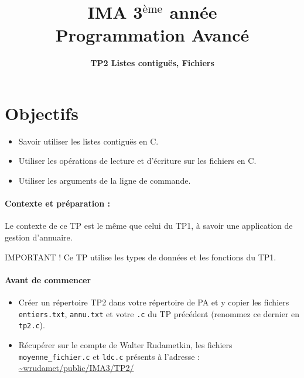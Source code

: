 \documentclass[final, pdftex, a4paper, openbib, ]{article}
\title{IMA 3$^{\mbox{\`eme}}$ année\\ Programmation Avancé
}
\author{\huge \textbf{TP2 Listes contiguës, Fichiers}}
\date{}
\begin{document}
\posttitle{\par\end{center}}
\setlength{\droptitle}{-45pt}
\maketitle

\vspace{-1.7cm}
\section{Objectifs}

\begin{itemize}
	\item Savoir utiliser les listes contiguës en C.
	\item Utiliser les opérations de lecture et d'écriture sur les fichiers en C.
	\item Utiliser les arguments de la ligne de commande.
\end{itemize}


\paragraph{Contexte et préparation : } Le contexte de ce TP est le même que celui du TP1, à savoir une application de gestion d'annuaire.

\begin{alertinfo}{IMPORTANT !}
	Ce TP utilise les types de données et les fonctions du TP1.
\end{alertinfo}


\paragraph{Avant de commencer}
\begin{itemize}
\item Créer un répertoire TP2 dans votre répertoire de PA et y copier les fichiers \texttt{entiers.txt}, \texttt{annu.txt} et votre \texttt{.c} du TP précédent (renommez ce dernier en \texttt{tp2.c}).
\item Récupérer sur le compte de Walter Rudametkin, les fichiers \texttt{moyenne\_fichier.c} et \texttt{ldc.c} présents à l'adresse : \url{~wrudamet/public/IMA3/TP2/}
\end{itemize}
\end{document}
